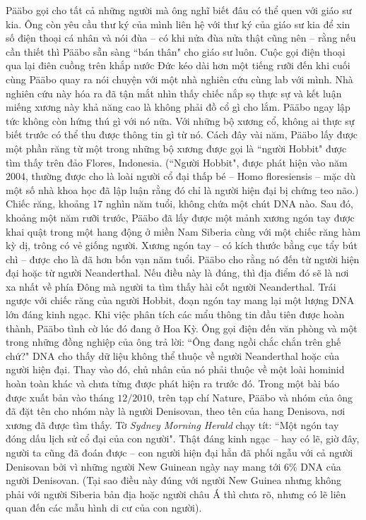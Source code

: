 \begin{multicols}{2}
	\vskip 0.1cm
	Pääbo gọi cho tất cả những người mà ông nghĩ biết đâu có thể quen với giáo sư kia. Ông còn yêu cầu thư ký của mình liên hệ với thư ký của giáo sư kia để xin số điện thoại cá nhân và nói đùa -- có khi nửa đùa nửa thật cũng nên -- rằng nếu cần thiết thì Pääbo sẵn sàng ``bán thân" cho giáo sư luôn. Cuộc gọi điện thoại qua lại điên cuồng trên khắp nước Đức kéo dài hơn một tiếng rưỡi đến khi cuối cùng Pääbo quay ra nói chuyện với một nhà nghiên cứu cùng lab với mình. Nhà nghiên cứu này hóa ra đã tận mắt nhìn thấy chiếc nắp sọ thực sự và kết luận miếng xương này khả năng cao là không phải đồ cổ gì cho lắm. Pääbo ngay lập tức không còn hứng thú gì với nó nữa.
	\vskip 0.1cm
	Với những bộ xương cổ, không ai thực sự biết trước có thể thu được thông tin gì từ nó. Cách đây vài năm, Pääbo lấy được một phần răng từ một trong những bộ xương được gọi là ``người Hobbit" được tìm thấy trên đảo Flores, Indonesia. (``Người Hobbit", được phát hiện vào năm $2004$, thường được cho là loài người cổ đại thấp bé -- Homo floresiensis -- mặc dù một số nhà khoa học đã lập luận rằng đó chỉ là người hiện đại bị chứng teo não.) Chiếc răng, khoảng $17$ nghìn năm tuổi, không chứa một chút DNA nào.
	\vskip 0.1cm
	Sau đó, khoảng một năm rưỡi trước, Pääbo đã lấy được một mảnh xương ngón tay được khai quật trong một hang động ở miền Nam Siberia cùng với một chiếc răng hàm kỳ dị, trông có vẻ giống người. Xương ngón tay -- có kích thước bằng cục tẩy bút chì -- được cho là đã hơn bốn vạn năm tuổi. Pääbo cho rằng nó đến từ người hiện đại hoặc từ người Neanderthal. Nếu điều này là đúng, thì địa điểm đó sẽ là nơi xa nhất về phía Đông mà người ta tìm thấy hài cốt người Neanderthal.
	\vskip 0.1cm
	Trái ngược với chiếc răng của người Hobbit, đoạn ngón tay mang lại một lượng DNA lớn đáng kinh ngạc. Khi việc phân tích các mẩu thông tin đầu tiên được hoàn thành, Pääbo tình cờ lúc đó đang ở Hoa Kỳ. Ông gọi điện đến văn phòng và một trong những đồng nghiệp của ông trả lời: ``Ông đang ngồi chắc chắn trên ghế chứ?" DNA cho thấy dữ liệu không thể thuộc về người Neanderthal hoặc của người hiện đại. Thay vào đó, chủ nhân của nó phải thuộc về một loài hominid hoàn toàn khác và chưa từng được phát hiện ra trước đó. Trong một bài báo được xuất bản vào tháng $12/2010$, trên tạp chí Nature, Pääbo và nhóm của ông đã đặt tên cho nhóm này là người Denisovan, theo tên của hang Denisova, nơi xương đã được tìm thấy. Tờ \textit{Sydney Morning Herald} chạy tít: ``Một ngón tay đóng dấu lịch sử cổ đại của con người". Thật đáng kinh ngạc -- hay có lẽ, giờ đây, người ta cũng đã đoán được -- con người hiện đại hẳn đã phối ngẫu với cả người Denisovan bởi vì những người New Guinean ngày nay mang tới $6\%$ DNA của người Denisovan. (Tại sao điều này đúng với người New Guinea nhưng không phải với người Siberia bản địa hoặc người châu Á thì chưa rõ, nhưng có lẽ liên quan đến các mẫu hình di cư của con người).

\end{multicols}
